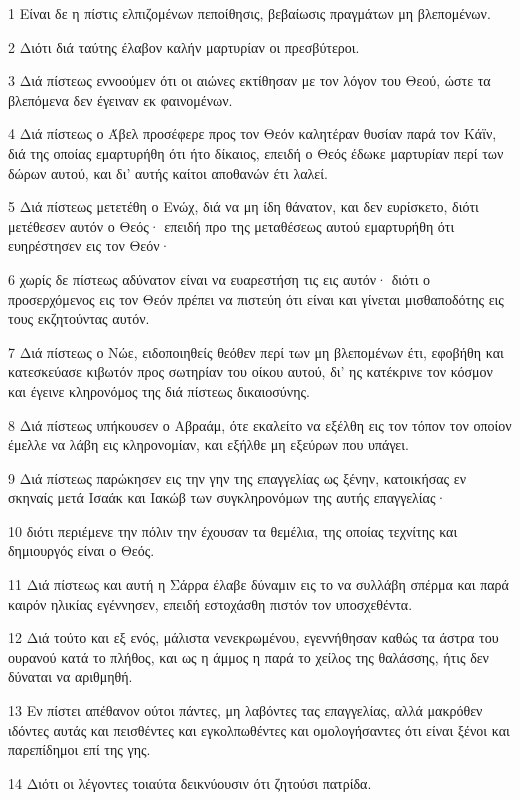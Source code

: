 \par 1 Είναι δε η πίστις ελπιζομένων πεποίθησις, βεβαίωσις πραγμάτων μη βλεπομένων.
\par 2 Διότι διά ταύτης έλαβον καλήν μαρτυρίαν οι πρεσβύτεροι.
\par 3 Διά πίστεως εννοούμεν ότι οι αιώνες εκτίθησαν με τον λόγον του Θεού, ώστε τα βλεπόμενα δεν έγειναν εκ φαινομένων.
\par 4 Διά πίστεως ο Άβελ προσέφερε προς τον Θεόν καλητέραν θυσίαν παρά τον Κάϊν, διά της οποίας εμαρτυρήθη ότι ήτο δίκαιος, επειδή ο Θεός έδωκε μαρτυρίαν περί των δώρων αυτού, και δι' αυτής καίτοι αποθανών έτι λαλεί.
\par 5 Διά πίστεως μετετέθη ο Ενώχ, διά να μη ίδη θάνατον, και δεν ευρίσκετο, διότι μετέθεσεν αυτόν ο Θεός· επειδή προ της μεταθέσεως αυτού εμαρτυρήθη ότι ευηρέστησεν εις τον Θεόν·
\par 6 χωρίς δε πίστεως αδύνατον είναι να ευαρεστήση τις εις αυτόν· διότι ο προσερχόμενος εις τον Θεόν πρέπει να πιστεύη ότι είναι και γίνεται μισθαποδότης εις τους εκζητούντας αυτόν.
\par 7 Διά πίστεως ο Νώε, ειδοποιηθείς θεόθεν περί των μη βλεπομένων έτι, εφοβήθη και κατεσκεύασε κιβωτόν προς σωτηρίαν του οίκου αυτού, δι' ης κατέκρινε τον κόσμον και έγεινε κληρονόμος της διά πίστεως δικαιοσύνης.
\par 8 Διά πίστεως υπήκουσεν ο Αβραάμ, ότε εκαλείτο να εξέλθη εις τον τόπον τον οποίον έμελλε να λάβη εις κληρονομίαν, και εξήλθε μη εξεύρων που υπάγει.
\par 9 Διά πίστεως παρώκησεν εις την γην της επαγγελίας ως ξένην, κατοικήσας εν σκηναίς μετά Ισαάκ και Ιακώβ των συγκληρονόμων της αυτής επαγγελίας·
\par 10 διότι περιέμενε την πόλιν την έχουσαν τα θεμέλια, της οποίας τεχνίτης και δημιουργός είναι ο Θεός.
\par 11 Διά πίστεως και αυτή η Σάρρα έλαβε δύναμιν εις το να συλλάβη σπέρμα και παρά καιρόν ηλικίας εγέννησεν, επειδή εστοχάσθη πιστόν τον υποσχεθέντα.
\par 12 Διά τούτο και εξ ενός, μάλιστα νενεκρωμένου, εγεννήθησαν καθώς τα άστρα του ουρανού κατά το πλήθος, και ως η άμμος η παρά το χείλος της θαλάσσης, ήτις δεν δύναται να αριθμηθή.
\par 13 Εν πίστει απέθανον ούτοι πάντες, μη λαβόντες τας επαγγελίας, αλλά μακρόθεν ιδόντες αυτάς και πεισθέντες και εγκολπωθέντες και ομολογήσαντες ότι είναι ξένοι και παρεπίδημοι επί της γης.
\par 14 Διότι οι λέγοντες τοιαύτα δεικνύουσιν ότι ζητούσι πατρίδα.
